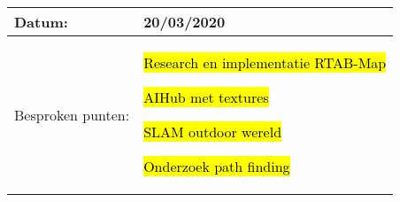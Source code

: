 \begin{tabularx}{\textwidth}{| l | X |}
  \hline
  Datum: & 20/03/2020\\
  \hline
  Besproken punten: &
  \begin{compactitem}
    \item \hl{Research en implementatie RTAB-Map}
    \item \hl{AIHub met textures}
    \item \hl{SLAM outdoor wereld}
    \item \hl{Onderzoek path finding}
  \end{compactitem}\\
  \hline
\end{tabularx}